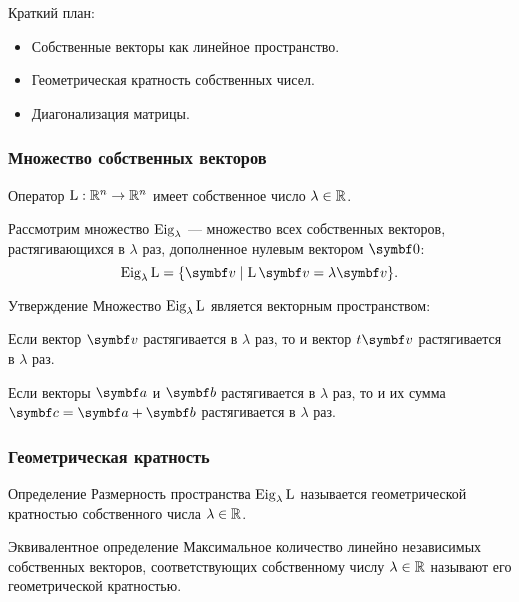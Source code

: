 
\begin{frame} %


\end{frame}



\begin{frame}{Краткий план:}
  \begin{itemize}[<+->]
    \item Собственные векторы как линейное пространство. 
    \item Геометрическая кратность собственных чисел.
    \item Диагонализация матрицы.
  \end{itemize}

\end{frame}


\begin{frame}
    \frametitle{Множество собственных векторов}

    Оператор $\operatorname{L} :\mathbb{R}^n \to \mathbb{R}^n$ имеет собственное число $\lambda \in \mathbb{R}$.
    
    Рассмотрим множество $\operatorname{Eig}_\lambda$ — множество всех собственных векторов, растягивающихся 
    в $\lambda$ раз, дополненное нулевым вектором $\bzero$:
    \[
        \eig_\lambda \LL = \{ \bv \mid \LL \bv = \lambda \bv \}.
    \]

    \pause

    \begin{block}{Утверждение}
        Множество $\operatorname{Eig}_{\lambda} \operatorname{L}$ является векторным пространством:
        \pause

        Если вектор $\bv$ растягивается в $\lambda$ раз, то и вектор $t \bv$ растягивается в $\lambda$ раз.
        \pause

       Если векторы $\ba$ и $\bb$ растягивается в $\lambda$ раз, 
       то и их сумма $\bc = \ba + \bb$ растягивается в $\lambda$ раз.
    \end{block}

    

\end{frame}


\begin{frame}
    \frametitle{Геометрическая кратность}

    \begin{block}{Определение}
        Размерность пространства $\operatorname{Eig}_\lambda \operatorname{L}$ называется
        \alert{геометрической кратностью} собственного числа $\lambda \in \mathbb{R}$.        
    \end{block}

    \pause
    \begin{block}{Эквивалентное определение}
        Максимальное количество линейно независимых собственных векторов,
        соответствующих собственному числу $\lambda  \in \mathbb{R}$ называют его 
        \alert{геометрической кратностью}.        
    \end{block}

\end{frame}


